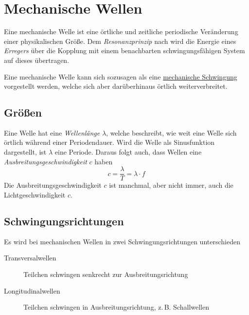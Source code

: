 \documentclass{article}
\begin{document}
\section{Mechanische Wellen} 
Eine mechanische Welle ist eine örtliche und zeitliche periodische Veränderung einer physikalischen Größe. Dem \emph{Resonanzprinzip} nach wird die Energie eines \emph{Erregers} über die Kopplung mit einem benachbarten schwingungsfähigen System auf dieses übertragen.
 
Eine mechanische Welle kann sich sozusagen als eine \hyperref[Mechanische Schwingungen]{mechanische Schwingung} vorgestellt werden, welche sich aber darüberhinaus örtlich weiterverbreitet.
 
\subsection{Größen} 
Eine Welle hat eine \emph{Wellenlänge} $\lambda$, welche beschreibt, wie weit eine Welle sich örtlich während einer Periodendauer. Wird die Welle als Sinusfunktion dargestellt, ist $\lambda$ eine Periode. Daraus folgt auch, dass Wellen eine \emph{Ausbreitungsgeschwindigkeit} $c$ haben
\[
 c = \frac{\lambda}{T} = \lambda \cdot f 
\]
Die Ausbreitungsgeschwindigkeit $c$ ist manchmal, aber nicht immer, auch die Lichtgeschwindigkeit $c$.
 
\subsection{Schwingungsrichtungen} 
Es wird bei mechanischen Wellen in zwei Schwingungsrichtungen unterschieden
\begin{description}
 \item[Transversalwellen] Teilchen schwingen senkrecht zur Ausbreitungsrichtung
 \item[Longitudinalwellen] Teilchen schwingen in Ausbreitungsrichtung, z.\,B. Schallwellen
\end{description}
 
\end{document}
